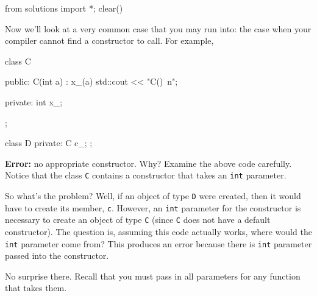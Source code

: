 \begin{python0}
from solutions import *; clear()
\end{python0}

Now we'll look at a very common case that you may run
into: the case when your compiler cannot find a constructor to call. For
example,

\begin{console}
class C
{
public:
        C(int a)
              : x_(a)
        {
              std::cout << "C()\ n";
        }
        
private:
        int x_;
};

class D
{
private:
        C c_;
};
\end{console}

\textbf{Error:} no appropriate constructor. Why? Examine the above code
carefully. Notice that the class \texttt{C} contains a constructor that
takes an \texttt{int} parameter.

So what's the problem? Well, if an object of type
\texttt{D} were created, then it would have to create its member,
\texttt{c}. However, an \texttt{int} parameter for the constructor is
necessary to create an object of type \texttt{C} (since \texttt{C} does not
have a default constructor). The question is, assuming this code
actually works, where would the \texttt{int} parameter come from? This
produces an error because there is  \texttt{int} parameter
passed into the constructor.

No surprise there. Recall that you must pass in all parameters for any
function that takes them.

